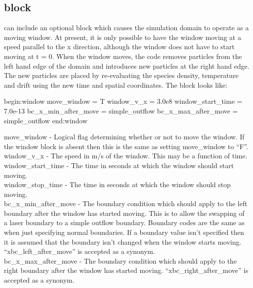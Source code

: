 \subsection{\texorpdfstring
  { block}
  {           {window} block}}
\label{sec:window_block}
{\EPOCH} can include an optional block which causes the simulation domain to
operate as a moving window. At present, it is only possible to have the window
moving at a speed parallel to the x direction, although the window
does not have to start moving at t = 0. When the window moves, the code removes
particles from the left hand edge of the domain and introduces new particles
at the right hand edge. The new particles are placed by re-evaluating the
species density, temperature and drift using the new time and spatial
coordinates. The block looks like:
\begin{boxverbatim}
begin:window
   move_window = T
   window_v_x = 3.0e8
   window_start_time = 7.0e-13
   bc_x_min_after_move = simple_outflow
   bc_x_max_after_move = simple_outflow
end:window
\end{boxverbatim}

{\emphtext move\_window} - Logical flag determining whether or not to move the
  window. If the window block is absent then this is the same as setting
  move\_window to ``F''.\\

{\emphtext window\_v\_x} - The speed in m/s of the window. This may be a
  function of time.\\

{\emphtext window\_start\_time} - The time in seconds at which the window should
  start moving.\\

{\emphtext window\_stop\_time} - The time in seconds at which the window should
  stop moving.\\

{\emphtext bc\_x\_min\_after\_move} - The boundary condition which should apply
  to the left boundary after the window has started moving. This is to allow
  the swapping of a laser boundary to a simple outflow boundary. Boundary codes
  are the same as when just specifying normal boundaries. If a boundary value
  isn't specified then it is assumed that the boundary isn't changed when the
  window starts moving. ``xbc\_left\_after\_move'' is accepted as a synonym.\\

{\emphtext bc\_x\_max\_after\_move} - The boundary condition which should apply
  to the right boundary after the window has started moving.
  ``xbc\_right\_after\_move'' is accepted as a synonym.\\

